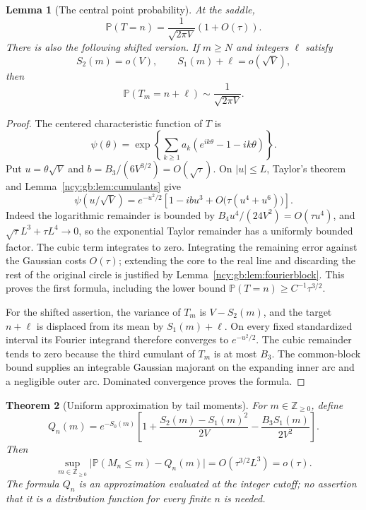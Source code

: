 \documentclass[11pt,letterpaper]{article}
\numberwithin{equation}{section}
\newtheorem{theorem}{Theorem}[section]
\newtheorem{lemma}[theorem]{Lemma}
\theoremstyle{remark}\newtheorem{remark}[theorem]{Remark}
\theoremstyle{definition}\newtheorem{definition}[theorem]{Definition}\theoremstyle{plain}
\newcommand{\Pbb}{\mathbb P}
\newcommand{\Z}{\mathbb Z}
\begin{document}
\begin{lemma}[The central point probability]
\label{ncy:gb:lem:localmass}
At the saddle,
\[
 \Pbb(T=n)=\frac{1}{\sqrt{2\pi V}}(1+O(\tau)).
\]
There is also the following shifted version.  If $m\geq N$ and integers
$\ell$ satisfy
\[
 S_2(m)=o(V),\qquad S_1(m)+\ell=o(\sqrt V),
\]
then
\[
 \Pbb(T_m=n+\ell)\sim\frac1{\sqrt{2\pi V}}.
\]
\end{lemma}

\begin{proof}
The centered characteristic function of $T$ is
\[
 \psi(\theta)
 =\exp\!\left\{\sum_{k\geq1}a_k
       (e^{ik\theta}-1-ik\theta)\right\}.
\]
Put $u=\theta\sqrt V$ and $b=B_3/(6V^{3/2})=O(\sqrt\tau)$.  On
$|u|\leq L$, Taylor's theorem and Lemma~\ref{ncy:gb:lem:cumulants} give
\begin{equation}
 \psi(u/\sqrt V)
 =e^{-u^2/2}\left[1-ibu^3
       +O\bigl(\tau(u^4+u^6)\bigr)\right].
 \label{ncy:gb:eq:fourier-full}
\end{equation}
Indeed the logarithmic remainder is bounded by
$B_4u^4/(24V^2)=O(\tau u^4)$, and
$\sqrt\tau L^3+\tau L^4\to0$, so the exponential Taylor remainder has a
uniformly bounded factor.  The cubic term integrates to zero.  Integrating
the remaining error against the Gaussian costs $O(\tau)$; extending the
core to the real line and discarding the rest of the original circle is
justified by Lemma~\ref{ncy:gb:lem:fourierblock}.  This proves the first formula,
including the lower bound $\Pbb(T=n)\geq C^{-1}\tau^{3/2}$.

For the shifted assertion, the variance of $T_m$ is $V-S_2(m)$, and the
target $n+\ell$ is displaced from its mean by $S_1(m)+\ell$.  On every
fixed standardized interval its Fourier integrand therefore converges to
$e^{-u^2/2}$.  The cubic remainder tends to zero because the third
cumulant of $T_m$ is at most $B_3$.  The common-block bound supplies an
integrable Gaussian majorant on the expanding inner arc and a negligible
outer arc.  Dominated convergence proves the formula.
\end{proof}

\begin{theorem}[Uniform approximation by tail moments]
\label{ncy:gb:thm:tailmoment}
For $m\in\Z_{\geq0}$, define
\[
 Q_n(m)=e^{-S_0(m)}
 \left[1+\frac{S_2(m)-S_1(m)^2}{2V}
              -\frac{B_3S_1(m)}{2V^2}\right].
\]
Then
\[
 \sup_{m\in\Z_{\geq0}}
 \bigl|\Pbb(M_n\leq m)-Q_n(m)\bigr|
 =O(\tau^{3/2}L^3)=o(\tau).
\]
The formula $Q_n$ is an approximation evaluated at the integer cutoff;
no assertion that it is a distribution function for every finite $n$ is
needed.
\end{theorem}
\end{document}
